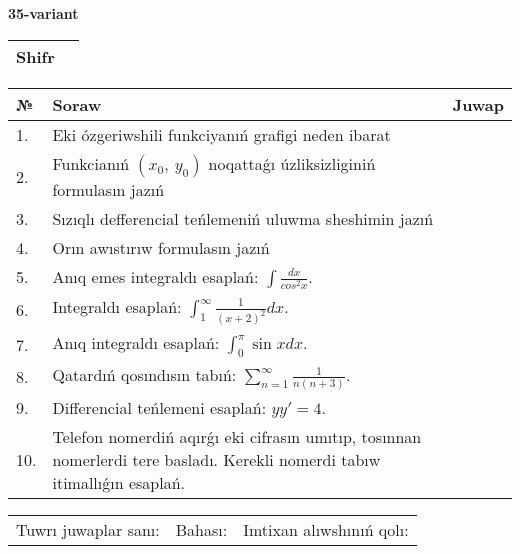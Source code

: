 \documentclass{article}
\begin{document}
  \egroup
  
  \newpage
  
  
  \textbf{35-variant}\\
  
  \bgroup
  \def\arraystretch{1.6} %
  
  \begin{tabular}{|m{5.7cm}|m{9.5cm}|}
  \hline
  Shifr & \\
  \hline
  \end{tabular}
  
  \vspace{1cm}
  
  \begin{tabular}{|m{0.7cm}|m{10cm}|m{4cm}|}
  \hline
  № & Soraw & Juwap \\
  \hline
  1. & Eki ózgeriwshili funkciyanıń grafigi neden ibarat &  \\
  \hline
  2. & Funkcianıń \((x_{0},\ y_{0})\) noqattaǵı úzliksizliginiń formulasın jazıń &  \\
  \hline
  3. & Sızıqlı defferencial teńlemeniń uluwma sheshimin jazıń &  \\
  \hline
  4. & Orın awıstırıw formulasın jazıń &  \\
  \hline
  5. & Anıq emes integraldı esaplań: \(\int\frac{dx}{cos^2 x}\). &  \\
  \hline
  6. & Integraldı esaplań: \(\int_{1}^{\infty}{\frac{1}{(x + 2)^2 }dx}\). &  \\
  \hline
  7. & Anıq integraldı esaplań: \(\int_{0}^{\pi}{\sin xdx}\). &  \\
  \hline
  8. & Qatardıń qosındısın tabıń: \(\sum_{n = 1}^{\infty}\frac{1}{n(n + 3)}\). &  \\
  \hline
  9. & Differencial teńlemeni esaplań: \(yy' = 4\). &  \\
  \hline
  10. & Telefon nomerdiń aqırǵı eki cifrasın umıtıp, tosınnan nomerlerdi tere basladı. Kerekli nomerdi tabıw itimallıǵın esaplań. &  \\
  \hline
  \end{tabular}
  
  \vspace{1cm}
  
  \begin{tabular}{lll}
  Tuwrı juwaplar sanı: \underline{\hspace{1.5cm}} & 
  Bahası: \underline{\hspace{1.5cm}} & 
  Imtixan alıwshınıń qolı: \underline{\hspace{2cm}} \\
  \end{tabular}
  
\end{document}
